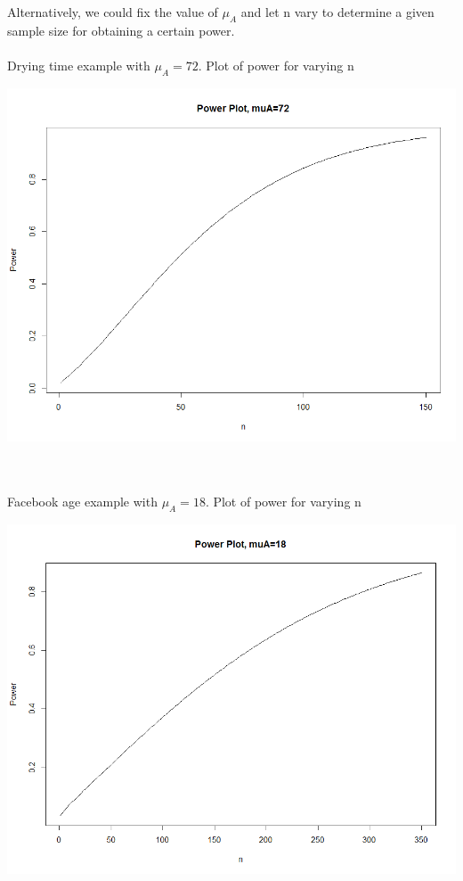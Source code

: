 Alternatively, we could fix the value of $\mu_A$ and let n vary to determine a given sample size for obtaining a certain power.\\~\\
Drying time example with $\mu_A=72$.  Plot of power for varying n
\begin{flushleft}
\includegraphics[scale=0.3]{powerplot3}
\end{flushleft}
~\\~\\
Facebook age example with $\mu_A=18$.  Plot of power for varying n
\begin{flushleft}
\includegraphics[scale=0.3]{powerplot4}
\end{flushleft}




